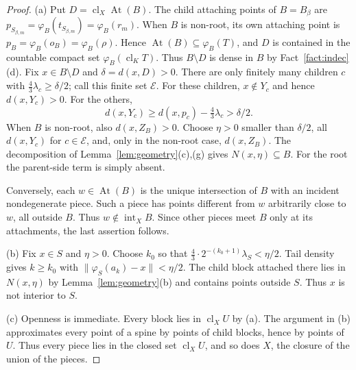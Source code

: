 \documentclass[11pt]{amsart}
\theoremstyle{definition}
\theoremstyle{remark}
\newcommand{\clX}{\operatorname{cl}_X}
\newcommand{\intX}{\operatorname{int}_X}
\newcommand{\At}{\operatorname{At}}
\newcommand{\Ec}{\mathcal{E}}
\begin{document}
\begin{proof}
(a) Put $D=\clX\At(B)$. The child attaching points of $B=B_\beta$ are $p_{S_{\beta,m}}=\varphi_B(t_{S_{\beta,m}})=\varphi_B(r_m)$. When $B$ is non-root, its own attaching point is $p_B=\varphi_B(o_B)=\varphi_B(\rho)$. Hence $\At(B)\subseteq\varphi_B(T)$, and $D$ is contained in the countable compact set $\varphi_B(\operatorname{cl}_KT)$. Thus $B\setminus D$ is dense in $B$ by Fact~\ref{fact:indec}(d). Fix $x\in B\setminus D$ and $\delta=d(x,D)>0$. There are only finitely many children $c$ with $\frac43\lambda_c\ge\delta/2$; call this finite set $\Ec$. For these children, $x\notin Y_c$ and hence $d(x,Y_c)>0$. For the others,
\[
d(x,Y_c)\ge d(x,p_c)-\tfrac43\lambda_c>\delta/2.
\]
When $B$ is non-root, also $d(x,Z_B)>0$. Choose $\eta>0$ smaller than $\delta/2$, all $d(x,Y_c)$ for $c\in\Ec$, and, only in the non-root case, $d(x,Z_B)$. The decomposition of Lemma~\ref{lem:geometry}(c),(g) gives $N(x,\eta)\subseteq B$. For the root the parent-side term is simply absent.

Conversely, each $w\in\At(B)$ is the unique intersection of $B$ with an incident nondegenerate piece. Such a piece has points different from $w$ arbitrarily close to $w$, all outside $B$. Thus $w\notin\intX B$. Since other pieces meet $B$ only at its attachments, the last assertion follows.

(b) Fix $x\in S$ and $\eta>0$. Choose $k_0$ so that $\frac43\cdot2^{-(k_0+1)}\lambda_S<\eta/2$. Tail density gives $k\ge k_0$ with $\|\varphi_S(a_k)-x\|<\eta/2$. The child block attached there lies in $N(x,\eta)$ by Lemma~\ref{lem:geometry}(b) and contains points outside $S$. Thus $x$ is not interior to $S$.

(c) Openness is immediate. Every block lies in $\clX U$ by (a). The argument in (b) approximates every point of a spine by points of child blocks, hence by points of $U$. Thus every piece lies in the closed set $\clX U$, and so does $X$, the closure of the union of the pieces.
\end{proof}
\end{document}
